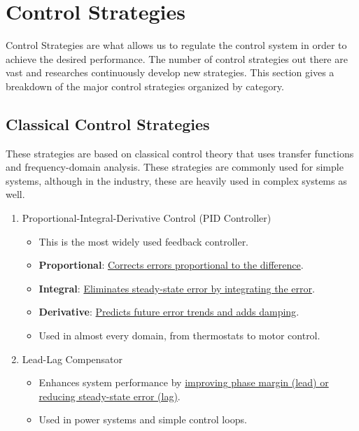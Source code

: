 \documentclass{article}
\begin{document}
\newpage

\section{Control Strategies}
Control Strategies are what allows us to regulate the control system in order to achieve the desired performance. The number of control strategies out there are vast and researches continuously develop new strategies. This section gives a breakdown of the major control strategies organized by category.

\subsection{Classical Control Strategies}
These strategies are based on classical control theory that uses transfer functions and frequency-domain analysis. These strategies are commonly used for simple systems, although in the industry, these are heavily used in complex systems as well.
\begin{enumerate}
    \item Proportional-Integral-Derivative Control (PID Controller)
        \begin{itemize}
            \item This is the most widely used feedback controller.
            \item \textbf{Proportional}: \underline{Corrects errors proportional to the difference}.
            \item \textbf{Integral}: \underline{Eliminates steady-state error by integrating the error}.
            \item \textbf{Derivative}: \underline{Predicts future error trends and adds damping}.
            \item Used in almost every domain, from thermostats to motor control.
        \end{itemize}
    \item Lead-Lag Compensator
        \begin{itemize}
            \item Enhances system performance by \underline{improving phase margin (lead) or reducing steady-state error (lag)}.
            \item Used in power systems and simple control loops.
        \end{itemize}
\end{enumerate}
\end{document}
